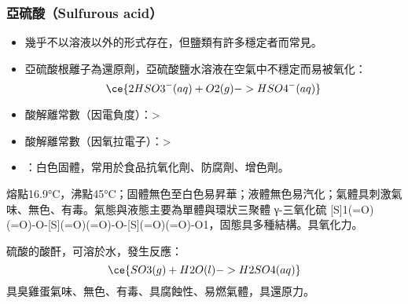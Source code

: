 \documentclass[a4paper,12pt]{report}
\begin{document}
\subsubsection{亞硫酸（Sulfurous acid）}
\begin{itemize}
\item 幾乎不以溶液以外的形式存在，但鹽類有許多穩定者而常見。
\item 亞硫酸根離子為還原劑，亞硫酸鹽水溶液在空氣中不穩定而易被氧化：
\[\ce{2HSO3^-(aq) + O2(g) -> HSO4^-(aq)}\]
\item 酸解離常數（因電負度）：>
\item 酸解離常數（因氧拉電子）：>
\item {}：白色固體，常用於食品抗氧化劑、防腐劑、增色劑。
\end{itemize}
\bit
\item 熔點16.9°C，沸點45°C；固體無色至白色易昇華；液體無色易汽化；氣體具刺激氣味、無色、有毒。氣態與液態主要為單體與環狀三聚體 γ-三氧化硫 [S]1(=O)(=O)-O-[S](=O)(=O)-O-[S](=O)(=O)-O1，固態具多種結構。具氧化力。
\item 硫酸的酸酐，可溶於水，發生反應：
\[\ce{SO3(g) + H2O(l) -> H2SO4(aq)}\]
\eit
{}
具臭雞蛋氣味、無色、有毒、具腐蝕性、易燃氣體，具還原力。
\end{document}
